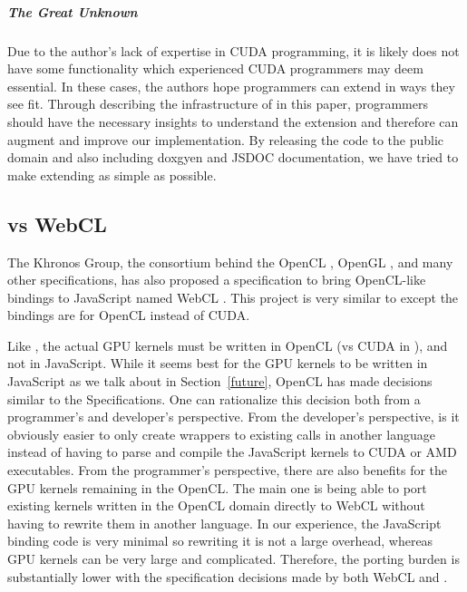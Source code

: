 \subparagraph{The Great Unknown}
Due to the author's lack of expertise in CUDA programming, it is likely \name
does not have some functionality which experienced CUDA programmers may deem
essential. In these cases, the authors hope programmers can extend \name in
ways they see fit. Through describing the infrastructure of \name in this paper,
programmers should have the necessary insights to understand the \name
extension and therefore can augment and improve our implementation. By releasing
the code to the public domain and also including doxgyen and
JSDOC documentation, we have tried to make extending \name as simple as
possible.



\subsection{\name vs WebCL}
\label{webCLDisc}
The Khronos Group, the consortium behind the OpenCL
\cite{openCL}, OpenGL \cite{openGL}, and many other specifications, has also
proposed a specification to bring OpenCL-like bindings to JavaScript named WebCL
\cite{webCLSpec}. This project is very similar to \name except the bindings are for
OpenCL instead of CUDA.

Like \namens, the actual GPU kernels must be written in OpenCL (vs CUDA in
\namens), and not in JavaScript. While it seems best for the GPU kernels to be
written in JavaScript as we talk about in Section~\ref{future}, OpenCL has made
decisions similar to the \name Specifications. One can rationalize this decision
both from a programmer's and developer's perspective. From the developer's
perspective, is it obviously easier to only create wrappers to existing calls in
another language instead of having to parse and compile the JavaScript kernels
to CUDA or AMD executables. From the programmer's perspective, there are also
benefits for the GPU kernels remaining in the OpenCL. The main one is being able
to port existing kernels written in the OpenCL domain directly to WebCL without
having to rewrite them in another language. In our experience, the JavaScript
binding code is very minimal so rewriting it is not a large overhead, whereas
GPU kernels can be very large and complicated. Therefore, the porting burden is
substantially lower with the specification decisions made by both WebCL and
\namens.

